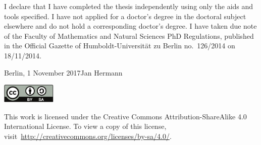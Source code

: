 \restoregeometry%

\noindent I declare that I have completed the thesis independently using only the aids and tools specified.
I have not applied for a doctor's degree in the doctoral subject elsewhere and do not hold a corresponding doctor's degree.
I have taken due note of the Faculty of Mathematics and Natural Sciences PhD Regulations, published in the Official Gazette of Humboldt-Universität zu Berlin no.\ 126/2014 on 18/11/2014.
\vspace{1cm}

\noindent Berlin, 1 November 2017\hfill Jan Hermann
\vspace*{\fill}
\begin{center}
\small
\includegraphics[height=2.5em]{media/by-sa.pdf}
\vspace{.5em}

\noindent This work is licensed under the Creative Commons Attribution-ShareAlike 4.0 International License.
To view a copy of this license, visit~\url{http://creativecommons.org/licenses/by-sa/4.0/}.
\end{center}




\tableofcontents



\cleardoublepage%










\begingroup
\setlength\bibsep{0pt}
\renewcommand\bibname{References}
\raggedright%
\footnotesize

\endgroup

%
% 


